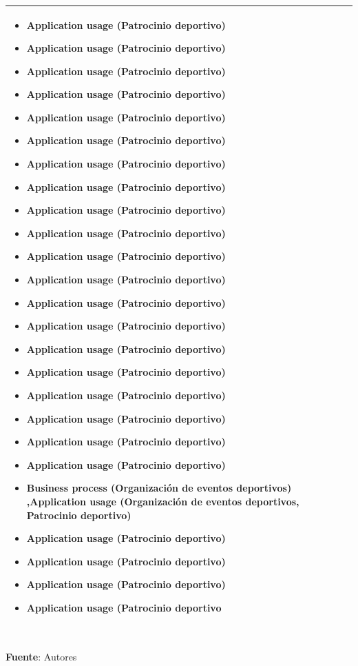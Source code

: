 \begin{table}[!htb]
\begin{center}
{\begin{tabular}{|p{7cm}|p{4cm}|}
\begin{itemize}
				\item Application usage (Patrocinio deportivo)
				\item Application usage (Patrocinio deportivo)
				\item Application usage (Patrocinio deportivo)
				\item Application usage (Patrocinio deportivo)
				\item Application usage (Patrocinio deportivo)
				\item Application usage (Patrocinio deportivo)
				\item Application usage (Patrocinio deportivo)
				\item Application usage (Patrocinio deportivo)
				\item Application usage (Patrocinio deportivo)
				\item Application usage (Patrocinio deportivo)
				\item Application usage (Patrocinio deportivo)
				\item Application usage (Patrocinio deportivo)
				\item Application usage (Patrocinio deportivo)
				\item Application usage (Patrocinio deportivo)
				\item Application usage (Patrocinio deportivo)
				\item Application usage (Patrocinio deportivo)
				\item Application usage (Patrocinio deportivo)
				\item Application usage (Patrocinio deportivo)
				\item Application usage (Patrocinio deportivo)
				\item Application usage (Patrocinio deportivo)
				\item Business process (Organización de eventos deportivos) ,Application usage (Organización de eventos deportivos, Patrocinio deportivo)
				\item Application usage (Patrocinio deportivo)
				\item Application usage (Patrocinio deportivo)
				\item Application usage (Patrocinio deportivo)
				\item Application usage (Patrocinio deportivo
			\end{itemize} 
			\\
			\hline
		\end{tabular}
		} \\
		\textbf{Fuente}: Autores
	\end{center}
\end{table}

